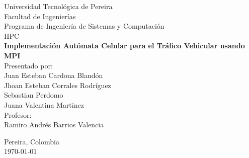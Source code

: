 \begin{titlepage}
    \centering
    \vspace*{0.5cm}
    
    {\Large Universidad Tecnológica de Pereira}\\[0.5cm]
    {\large Facultad de Ingenierías}\\[0.3cm]
    {\large Programa de Ingeniería de Sistemas y Computación}\\[0.3cm]
    {\large HPC}\\[3cm]
    
    {\LARGE\textbf{Implementación Autómata Celular para el Tráfico Vehicular usando MPI}}\\[2cm]
        
    {\large Presentado por:}\\[0.3cm]
    {\large Juan Esteban Cardona Blandón}\\[0.3cm]
    {\large Jhoan Esteban Corrales Rodríguez}\\[0.3cm]
    {\large Sebastian Perdomo}\\[0.3cm]
    {\large Juana Valentina Martínez}\\[1cm]
    {\large Profesor:}\\[0.3cm]
    {\large Ramiro Andrés Barrios Valencia}\\[0.3cm]
        
    \vfill
    
    {\large Pereira, Colombia}\\[0.3cm]
    {\large \today}
    
\end{titlepage}